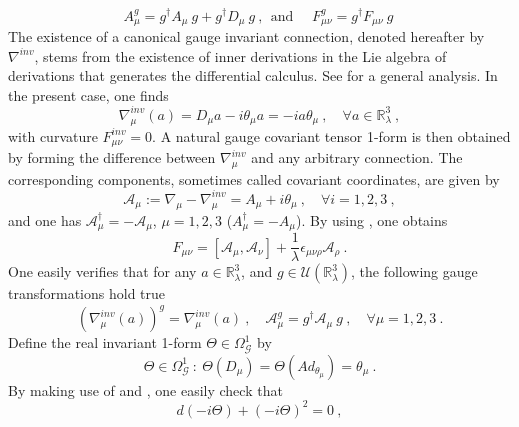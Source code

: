 \documentclass[10pt]{book}
\theoremstyle{break}
\begin{document}
%
\begin{equation}
A_\mu^g = g^\dag A_\mu \ g + g^\dag D_\mu \ g \ , \ \ \mbox{and } \quad F^g_{\mu\nu} = g^\dag F_{\mu\nu} \ g \ %
\end{equation}
%
The existence of a canonical gauge invariant connection, denoted hereafter by $\nabla^{inv}$, stems from the existence of inner derivations in the Lie algebra of derivations that generates the differential calculus. See %
for a general analysis. In the present case, one finds
%
\begin{equation} 
\nabla^{inv}_\mu(a) = D_\mu a - i \theta_\mu a = - i a \theta_\mu \ , \quad \forall a \in \mathbb{R}^3_\lambda \ , %
\end{equation}
%
with curvature $F^{inv}_{\mu\nu}=0$. A natural gauge covariant tensor 1-form is then obtained by forming the difference between $\nabla^{inv}_\mu$ and any arbitrary connection. The corresponding components, sometimes called covariant coordinates, are given by%
%
\begin{equation}
\mathcal{A}_\mu := \nabla_\mu - \nabla^{inv}_\mu = A_\mu + i \theta_\mu \ , \quad \forall i=1,2,3 \ , %
\end{equation}
%
and one has $\mathcal{A}_\mu^\dag = - \mathcal{A}_\mu$, $\mu=1,2,3$ ($A_\mu^\dag=-A_\mu$). By using %
, one obtains%
%
\begin{equation} 
F_{\mu\nu} = \left[\mathcal{A}_\mu,\mathcal{A}_\nu\right] + \frac{1}{\lambda} \epsilon_{\mu\nu\rho} \mathcal{A}_\rho \ .%
\end{equation}
%
One easily verifies that for any $a\in\mathbb{R}^3_\lambda$, and $g\in\mathcal{U}(\mathbb{R}^3_\lambda)$, the following gauge transformations hold true%
%
\begin{equation}
(\nabla^{inv}_\mu(a))^g = \nabla^{inv}_\mu(a) \ , \quad \mathcal{A}^g_\mu = g^\dag \mathcal{A}_\mu \ g \ , \quad \forall \mu=1,2,3 \ . %
\end{equation}
%
Define the real invariant 1-form $\Theta\in\Omega^1_\mathcal{G}$ by%
%
\begin{equation}
\Theta \in \Omega^1_\mathcal{G} \ : \ \Theta(D_\mu) = \Theta(Ad_{\theta_\mu}) = \theta_\mu \ .
\end{equation}
%
By making use of %
and %
, one easily check that%
%
\begin{equation}
d(-i\Theta)+(-i\Theta)^2=0 \ ,
\end{equation}
\end{document}
